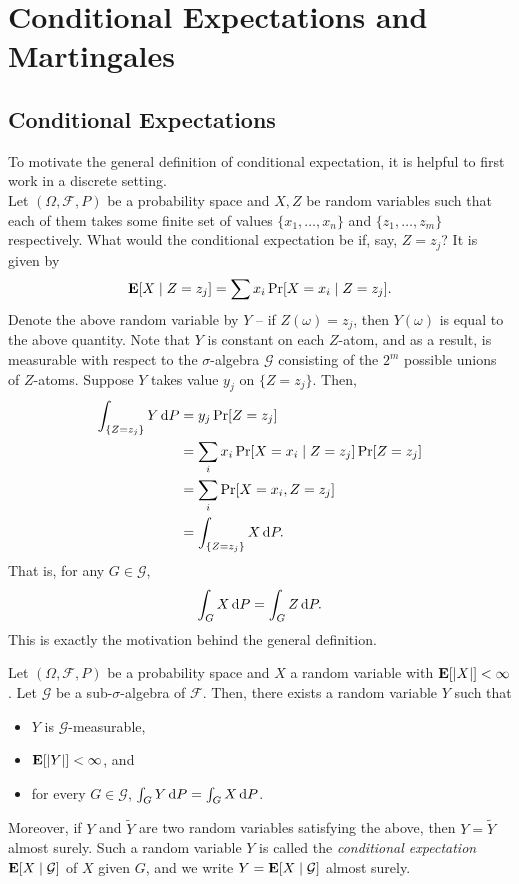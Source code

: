 \section{Conditional Expectations and Martingales}

	\subsection{Conditional Expectations}

		To motivate the general definition of conditional expectation, it is helpful to first work in a discrete setting.\\

		Let $(\Omega,\mathcal{F},P)$ be a probability space and $X,Z$ be random variables such that each of them takes some finite set of values $\{x_1,\ldots,x_n\}$ and $\{z_1,\ldots,z_m\}$ respectively. What would the conditional expectation be if, say, $Z=z_j$? It is given by
		\[ \textbf{E}[X\mid Z=z_j] = \sum x_i \Pr[X=x_i \mid Z=z_j]. \]
		Denote the above random variable by $Y$ -- if $Z(\omega)=z_j$, then $Y(\omega)$ is equal to the above quantity. Note that $Y$ is constant on each $Z$-atom, and as a result, is measurable with respect to the $\sigma$-algebra $\mathcal{G}$ consisting of the $2^m$ possible unions of $Z$-atoms. Suppose $Y$ takes value $y_j$ on $\{Z=z_j\}$. Then,
		\begin{align*}
			\int_{\{Z=z_j\}} Y\operatorname{d}\!{P} &= y_j \Pr[Z=z_j] \\
				&= \sum_i x_i \Pr[X=x_i\mid Z=z_j]\Pr[Z=z_j] \\
				&= \sum_i \Pr[X=x_i, Z=z_j] \\
				&= \int_{\{Z=z_j\}} X\operatorname{d}\!{P}.
		\end{align*}
		That is, for any $G\in\mathcal{G}$,
		\[ \int_G X\operatorname{d}\!{P} = \int_G Z\operatorname{d}\!{P}. \]
		This is exactly the motivation behind the general definition.

		\begin{fdef}
			Let $(\Omega,\mathcal{F},P)$ be a probability space and $X$ a random variable with $\textbf{E}[|X|]<\infty$. Let $\mathcal{G}$ be a sub-$\sigma$-algebra of $\mathcal{F}$. Then, there exists a random variable $Y$ such that
			\begin{itemize}
				\item $Y$ is $\mathcal{G}$-measurable,
				\item $\textbf{E}[|Y|]<\infty$, and
				\item for every $G\in\mathcal{G}$, $\int_G Y\operatorname{d}\!{P} = \int_G X\operatorname{d}\!{P}$.
			\end{itemize}
			Moreover, if $Y$ and $\tilde{Y}$ are two random variables satisfying the above, then $Y=\tilde{Y}$ almost surely. Such a random variable $Y$ is called the \textit{conditional expectation} $\textbf{E}[X\mid\mathcal{G}]$ of $X$ given $G$, and we write $Y=\textbf{E}[X\mid\mathcal{G}]$ almost surely.
		\end{fdef}

